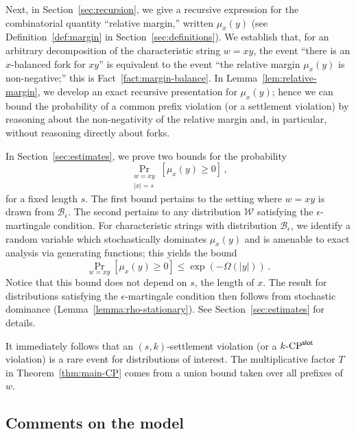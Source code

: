 Next, in Section~\ref{sec:recursion}, 
we give a recursive expression for the combinatorial quantity 
``relative margin,'' written
$\mu_x(y)$ (see Definition~\ref{def:margin} in Section~\ref{sec:definitions}). 
We establish that,
for an arbitrary decomposition of the characteristic string $w = xy$, 
the event ``there is an $x$-balanced fork for $xy$'' 
is equivalent to the event 
``the relative margin $\mu_x(y)$ is non-negative;'' 
this is Fact~\ref{fact:margin-balance}. 
In Lemma~\ref{lem:relative-margin}, we develop an exact recursive presentation for $\mu_x(y)$; hence we can bound the probability of a common prefix violation
(or a settlement violation) 
by reasoning about the non-negativity of the relative margin 
and, in particular, without reasoning directly about forks. 

In Section~\ref{sec:estimates}, we prove two bounds for the probability 
\[
  \Pr_{\substack{w = xy\\|x| = s}}[\mu_x(y) \geq 0]\,,
\]
for a fixed length $s$.  The first bound pertains to the setting where
$w = xy$ is drawn from $\mathcal{B}_\epsilon$. The second pertains to
any distribution $\mathcal{W}$ satisfying the $\epsilon$-martingale
condition.  For characteristic strings with distribution
$\mathcal{B}_\epsilon$, we identify a random variable which
stochastically dominates $\mu_x(y)$ and is amenable to exact analysis
via generating functions; this yields the bound
\[
  \Pr_{w=xy}[\mu_x(y) \geq 0] \leq \exp(-\Omega(|y|))
  \,.
\]
Notice that this bound does not depend on $s$, the length of $x$.  The
result for distributions satisfying the $\epsilon$-martingale
condition then follows from stochastic dominance
(Lemma~\ref{lemma:rho-stationary}).  See Section~\ref{sec:estimates}
for details.

It immediately follows that 
an $(s,k)$-settlement violation (or a ${k}\text{-}\mathrm{CP}^{\mathsf{slot}}$ violation) is a rare event 
for distributions of interest. 
The multiplicative factor $T$ in Theorem~\ref{thm:main-CP} comes from a union bound 
taken over all prefixes of $w$.




\subsection{Comments on the model}
\label{sec:model-comments}

